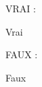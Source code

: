 \documentclass{article}
\newif\iflogvar
\newcommand{\test}{
		\iflogvar
			Vrai
		\else
			Faux
		\fi
	}
\begin{document}
VRAI :
\logvartrue
\test

FAUX :
\logvarfalse
\test
\end{document}

